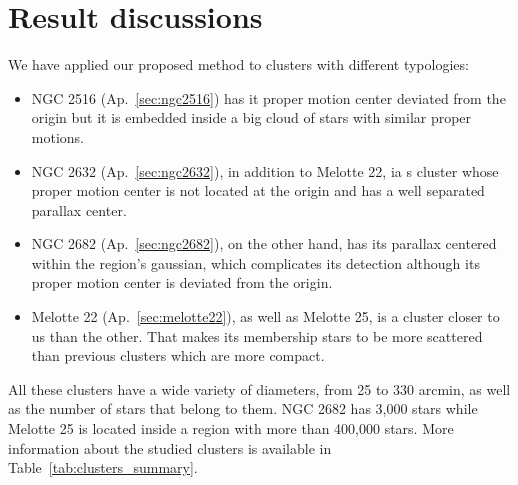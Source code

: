 \documentclass[11pt,a4paper,english,twocolumn]{article}
\begin{document}
\section{Result discussions}

We have applied our proposed method to clusters with different typologies:

\begin{itemize}
  \item NGC 2516 (Ap.~\ref{sec:ngc2516}) has it proper motion center deviated from the origin but
        it is embedded inside a big cloud of stars with similar proper motions.
  \item NGC 2632 (Ap.~\ref{sec:ngc2632}), in addition to Melotte 22, ia s cluster whose proper motion center
        is not located at the origin and has a well separated parallax center.
  \item NGC 2682 (Ap.~\ref{sec:ngc2682}), on the other hand, has its parallax centered within the region's gaussian,
        which complicates its detection although its proper motion center is deviated from the origin.
  \item Melotte 22 (Ap.~\ref{sec:melotte22}), as well as Melotte 25, is a cluster closer to us than the other.
        That makes its membership stars to be more scattered than previous clusters which are more compact.
\end{itemize}

All these clusters have a wide variety of diameters, from 25 to 330 arcmin,
as well as the number of stars that belong to them. NGC 2682 has 3,000 stars
while Melotte 25 is located inside a region with more than 400,000 stars.
More information about the studied clusters is available in Table~\ref{tab:clusters_summary}.

\begin{table}[htbp]
  \begin{center}
    \caption{Right ascension, declination, radius and number of stars of studied clusters.
             The number of stars corresponds to those stars contained within a cone of center
             \((\alpha, \delta)\) and radius the cluster's radius multiplied by a factor of 1.5.}
    \label{tab:clusters_summary}
  \end{center}
\end{table}
\end{document}
